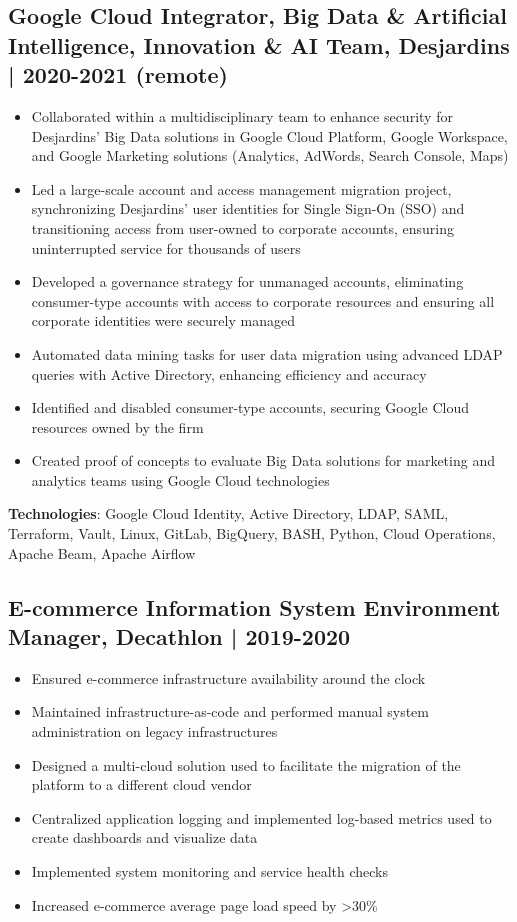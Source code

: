 \documentclass[11pt,a4paper]{article}
\begin{document}
\subsection*{Google Cloud Integrator, Big Data \& Artificial Intelligence, Innovation \& AI Team, Desjardins | 2020-2021 (remote)}
\label{sec:org7f8c71d}
\begin{itemize}
\item Collaborated within a multidisciplinary team to enhance security for Desjardins' Big Data solutions in Google Cloud Platform, Google Workspace, and Google Marketing solutions (Analytics, AdWords, Search Console, Maps)
\item Led a large-scale account and access management migration project, synchronizing Desjardins' user identities for Single Sign-On (SSO) and transitioning access from user-owned to corporate accounts, ensuring uninterrupted service for thousands of users
\item Developed a governance strategy for unmanaged accounts, eliminating consumer-type accounts with access to corporate resources and ensuring all corporate identities were securely managed
\item Automated data mining tasks for user data migration using advanced LDAP queries with Active Directory, enhancing efficiency and accuracy
\item Identified and disabled consumer-type accounts, securing Google Cloud resources owned by the firm
\item Created proof of concepts to evaluate Big Data solutions for marketing and analytics teams using Google Cloud technologies
\end{itemize}

\textbf{Technologies}: Google Cloud Identity, Active Directory, LDAP, SAML, Terraform, Vault, Linux, GitLab, BigQuery, BASH, Python, Cloud Operations, Apache Beam, Apache Airflow
\subsection*{E-commerce Information System Environment Manager, Decathlon | 2019-2020}
\label{sec:orga0a7c6e}
\begin{itemize}
\item Ensured e-commerce infrastructure availability around the clock
\item Maintained infrastructure-as-code and performed manual system administration on legacy infrastructures
\item Designed a multi-cloud solution used to facilitate the migration of the platform to a different cloud vendor
\item Centralized application logging and implemented log-based metrics used to create dashboards and visualize data
\item Implemented system monitoring and service health checks
\item Increased e-commerce average page load speed by >30\%
\end{itemize}
\end{document}
